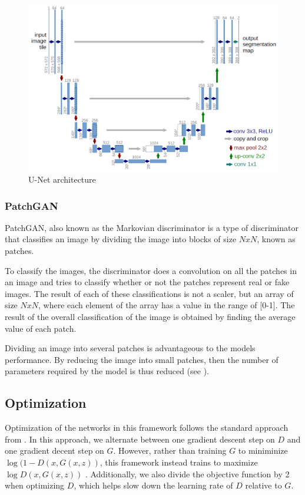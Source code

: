 \documentclass[peerreview]{IEEEtran}
\begin{document}

\begin{figure}[t]
\centering
\includegraphics[width=0.8\columnwidth]{u-net-architecture.png} 
\caption{U-Net architecture \cite{olaf2015unetimage}}
\label{fig:U-Net}
\end{figure}

\subsubsection{PatchGAN}
PatchGAN, also known as the Markovian discriminator is a type of discriminator that classifies an image by dividing the image into blocks of size $NxN$, known as patches.

To classify the images, the discriminator does a convolution on all the patches in an image and tries to classify whether or not the patches represent real or fake images. The result of each of these classifications is not a scaler, but an array of size $NxN$, where each element of the array has a value in the range of [0-1]. The result of the overall classification of the image is obtained by finding the average value of each patch.

Dividing an image into several patches is advantageous to the models performance. By reducing the image into small patches, then the number of parameters required by the model is thus reduced (see \cite{isola2017image}).


\subsection{Optimization}
Optimization of the networks in this framework follows the standard approach from \cite{goodfellow2014generative}. In this approach, we alternate between one gradient descent step on $D$ and one gradient decent step on $G$. However, rather than training $G$ to miniminize $\log (1-D(x, G(x,z))$, this framework instead trains to maximize $\log D(x, G(x, z))$ \cite{isola2017image}. Additionally, we also divide the objective function by 2 when optimizing $D$, which helps slow down the learning rate of $D$ relative to $G$.
\end{document}
